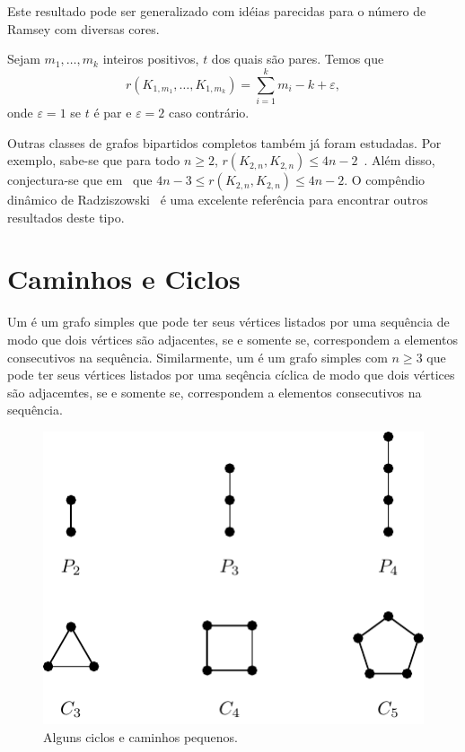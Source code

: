 Este resultado pode ser generalizado com idéias parecidas para o número de Ramsey com diversas cores.

\begin{theorem}
Sejam $m_1, \dots, m_k$ inteiros positivos, $t$ dos quais são pares. Temos que
\[r(K_{1,m_1}, \dotsc,  K_{1,m_k}) = \sum_{i=1}^{k} m_i  - k + \varepsilon,\]
onde $\varepsilon = 1$ se $t$ é par e $\varepsilon = 2$ caso contrário.
\end{theorem}

Outras classes de grafos bipartidos completos também já foram estudadas. Por exemplo, sabe-se que para todo $n\geq 2$,  $r(K_{2,n}, K_{2,n}) \leq 4n -2$~\cite{exoo}. Além disso, conjectura-se que em~\cite{lortz2002ramsey} que $4n - 3 \leq r(K_{2,n}, K_{2,n}) \leq 4n -2$.
O compêndio dinâmico de Radziszowski~\cite{small_ramsey} é uma excelente referência para encontrar outros resultados deste tipo.


\section{Caminhos e Ciclos}

Um  é um grafo simples que pode ter seus vértices listados por uma sequência de modo que dois vértices são adjacentes, se e somente se, correspondem a elementos consecutivos na sequência. Similarmente, um  é um grafo simples com $n \geq 3$ que pode ter seus vértices listados por uma seqência cíclica de modo que dois vértices são adjacemtes, se e somente se, correspondem a elementos consecutivos na sequência.

\begin{figure}[ht!]
\centering
\includegraphics{figures/3_graph_2_cyclepath}
\caption{Alguns ciclos e caminhos pequenos.}
\label{graph:fig:cyclepath}
\end{figure}

